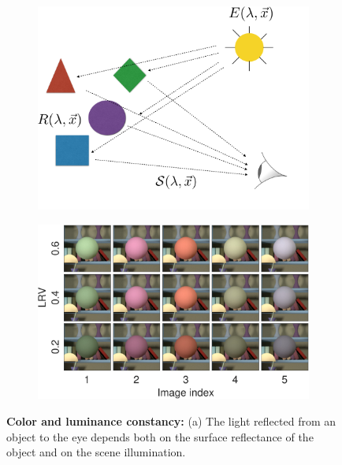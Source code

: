 \documentclass{jov}
\begin{document}
\begin{figure}
\centering
\begin{subfigure}{0.4 \textwidth}
	\centering
	\caption{}
        \includegraphics[width=\textwidth]{../FiguresDraft5/Figure1/Figure1_a.png}
        \label{fig:introSchematic}
    \end{subfigure}
    \begin{subfigure}{0.55 \textwidth}   
        \caption{}    
        \includegraphics[width=\textwidth]{../FiguresDraft5/Figure1/Figure1_b.pdf}
        \label{fig:introExampleFigure}
    \end{subfigure}
    \label{introFigure}
    \caption{{\bf Color and luminance constancy:} (a)  The light reflected from an object to the eye depends both on the surface reflectance of the object and on the scene illumination. 
}
\end{figure}
\end{document}
